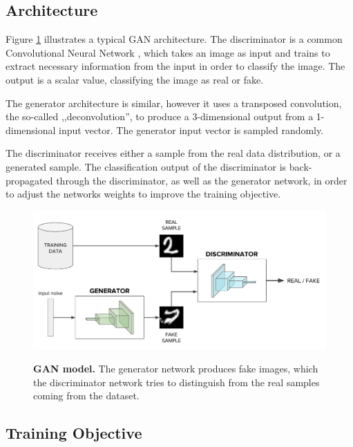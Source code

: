 \documentclass[12pt]{report}
\begin{document}
\pagebreak
\subsection{Architecture}

Figure \ref{fig:gan} illustrates a typical GAN architecture. The discriminator is a common Convolutional Neural Network \cite{lecun_convolutional_1995}, which takes an image as input and trains to extract necessary information from the input in order to classify the image. The output is a scalar value, classifying the image as real or fake.

The generator architecture is similar, however it uses a transposed convolution, the so-called ,,deconvolution'', to produce a 3-dimensional output from a 1-dimensional input vector. The generator input vector is sampled randomly.

The discriminator receives either a sample from the real data distribution, or a generated sample. The classification output of the discriminator is back-propagated  through the discriminator, as well as the generator network, in order to adjust the networks weights to improve the training objective.

\begin{figure}[h]
\centering
{\includegraphics[width=\linewidth]{02_background/gan_model}}
\caption{\label{fig:gan} \textbf{GAN model.} The generator network produces fake images, which the discriminator network tries to distinguish from the real samples coming from the dataset.}
\end{figure}

\subsection{Training Objective} \label{sec:GAN_training}
\end{document}
